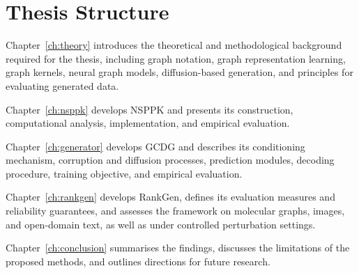 \section{Thesis Structure}
\label{sec:intro:structure}

Chapter~\ref{ch:theory} introduces the theoretical and methodological
background required for the thesis, including graph notation, graph
representation learning, graph kernels, neural graph models, diffusion-based
generation, and principles for evaluating generated data.

Chapter~\ref{ch:nsppk} develops NSPPK and presents its construction,
computational analysis, implementation, and empirical evaluation.

Chapter~\ref{ch:generator} develops GCDG and describes its conditioning
mechanism, corruption and diffusion processes, prediction modules, decoding
procedure, training objective, and empirical evaluation.

Chapter~\ref{ch:rankgen} develops RankGen, defines its evaluation measures and
reliability guarantees, and assesses the framework on molecular graphs, images,
and open-domain text, as well as under controlled perturbation settings.

Chapter~\ref{ch:conclusion} summarises the findings, discusses the limitations
of the proposed methods, and outlines directions for future research.
